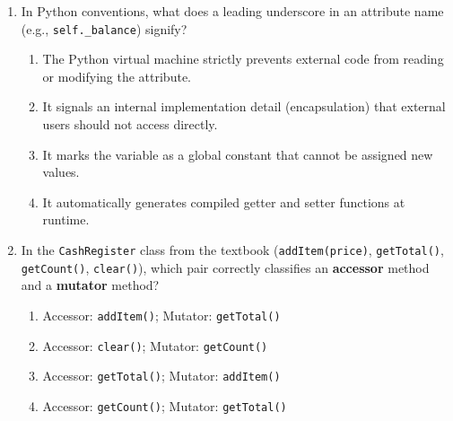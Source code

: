 \documentclass[11pt,a4paper]{article}
\begin{document}
\begin{enumerate}[label=\textbf{Q\arabic*.},leftmargin=2em,itemsep=1.5pt,topsep=1pt]
\begin{enumerate}[label=\Alph*.,leftmargin=2em]
\end{enumerate}
\item In Python conventions, what does a leading underscore in an attribute name (e.g., \texttt{self.\_balance}) signify?
\begin{enumerate}[label=\Alph*.,leftmargin=2em]
\item The Python virtual machine strictly prevents external code from reading or modifying the attribute.
\item It signals an internal implementation detail (encapsulation) that external users should not access directly.
\item It marks the variable as a global constant that cannot be assigned new values.
\item It automatically generates compiled getter and setter functions at runtime.
\end{enumerate}
\item In the \texttt{CashRegister} class from the textbook (\texttt{addItem(price)}, \texttt{getTotal()}, \texttt{getCount()}, \texttt{clear()}), which pair correctly classifies an \textbf{accessor} method and a \textbf{mutator} method?
\begin{enumerate}[label=\Alph*.,leftmargin=2em]
\item Accessor: \texttt{addItem()}; Mutator: \texttt{getTotal()}
\item Accessor: \texttt{clear()}; Mutator: \texttt{getCount()}
\item Accessor: \texttt{getTotal()}; Mutator: \texttt{addItem()}
\item Accessor: \texttt{getCount()}; Mutator: \texttt{getTotal()}
\end{enumerate}
\end{enumerate}
\newpage
\end{document}
